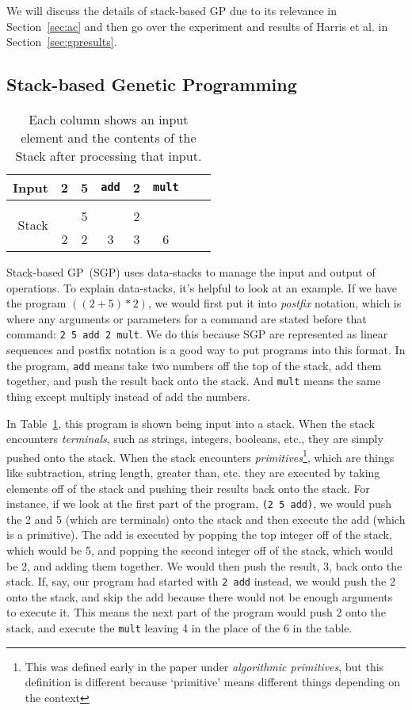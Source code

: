 \documentclass{sig-alternate}
\begin{document}
We will discuss the details of stack-based GP due to its relevance in Section~\ref{sec:ac} and then go over the experiment and results of Harris et al. in Section~\ref{sec:gpresults}.
\vspace{.4cm}
\subsection{Stack-based Genetic Programming}
\label{sec:sgp}
\begin{table}
	\centering
	\begin{tabular}{|r|c|c|c|c|c|c|c|}
		\hline
		Input & 2 & 5 & \texttt{add} & 2 & \texttt{mult} \\
		\hline
		\multirow{3}{*}{Stack} & & & & &\\
		&   & 5 &   & 2 &   \\
		& 2 & 2 & 3 & 3 & 6 \\
		\hline
	\end{tabular}
	\caption{Each column shows an input element and the contents of the Stack after processing that input.}
	\label{tab:stacks}
\end{table}

Stack-based GP~(SGP) uses data-stacks to manage the input and output of operations. To explain data-stacks, it's helpful to look at an example. If we have the program $((2+5)*2)$, we would first put it into \textit{postfix} notation, which is where any arguments or parameters for a command are stated before that command: \texttt{2~5~add~2~mult}. We do this because SGP are represented as linear sequences and postfix notation is a good way to put programs into this format. In the program, \texttt{add} means take two numbers off the top of the stack, add them together, and push the result back onto the stack. And \texttt{mult} means the same thing except multiply instead of add the numbers.

In Table~\ref{tab:stacks}, this program is shown being input into a stack. When the stack encounters \textit{terminals}, such as strings, integers, booleans, etc., they are simply pushed onto the stack. When the stack encounters \textit{primitives}\footnote{This was defined early in the paper under \textit{algorithmic primitives}, but this definition is different because `primitive' means different things depending on the context}, which are things like subtraction, string length, greater than, etc. they are executed by taking elements off of the stack and pushing their results back onto the stack. For instance, if we look at the first part of the program, \texttt{(2~5~add)}, we would push the 2 and 5 (which are terminals) onto the stack and then execute the add (which is a primitive). The add is executed by popping the top integer off of the stack, which would be 5, and popping the second integer off of the stack, which would be 2, and adding them together. We would then push the result, 3, back onto the stack. If, say, our program had started with \texttt{2 add} instead, we would push the 2 onto the stack, and skip the add because there would not be enough arguments to execute it. This means the next part of the program would push 2 onto the stack, and execute the \texttt{mult} leaving 4 in the place of the 6 in the table.
\end{document}
